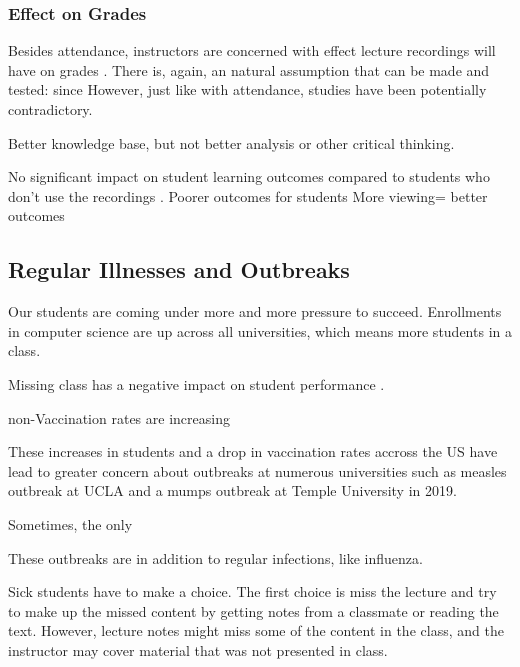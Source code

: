 \documentclass[sigconf]{acmart}
\begin{document}
\subsubsection{Effect on Grades}
Besides attendance, instructors are concerned with effect lecture recordings will have on grades \cite{maynor2013student}.
There is, again, an natural assumption that can be made and tested: since
However, just like with attendance, studies have been potentially contradictory.

Better knowledge base, but not better analysis or other critical thinking.\cite{bos2016use}



No significant impact on student learning outcomes compared to students who don't use the recordings \cite{leadbeater2013evaluating}.
Poorer outcomes for students \cite{johnston2013digital}
More viewing= better outcomes 
\cite{traphagan2010impact}
\subsection{Regular Illnesses and Outbreaks}
Our students are coming under more and more pressure to succeed.  
Enrollments in computer science are up across all universities, which means more students in a class. 

Missing class has a negative impact on student performance \cite{traphagan2010impact}.


non-Vaccination rates are increasing\cite{omer2009vaccine}

These increases in students and a drop in vaccination rates accross the US have lead to greater concern about outbreaks at numerous universities such as measles outbreak at UCLA \cite{uclameas} and a mumps outbreak at Temple University \cite{emezienna2019resurgence} in 2019.

Sometimes, the only 

These outbreaks are in addition to regular infections, like influenza. 


Sick students have to make a choice. 
The first choice is miss the lecture and try to make up the missed content by getting notes from a classmate or reading the text.
However, lecture notes might miss some of the content in the class, and the instructor may cover material that was not presented in class.

\end{document}
